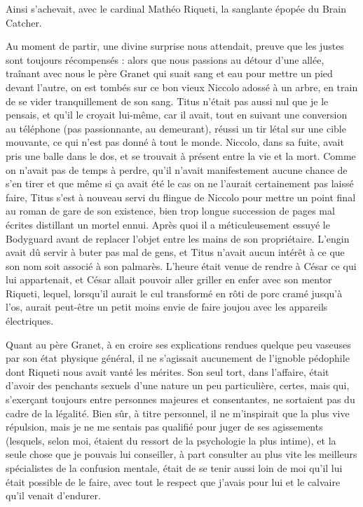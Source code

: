 Ainsi s’achevait, avec le cardinal Mathéo Riqueti, la sanglante épopée du Brain Catcher.

Au moment de partir, une divine surprise nous attendait, preuve que les justes sont toujours récompensés : alors que nous passions au détour d’une allée, traînant avec nous le père Granet qui suait sang et eau pour mettre un pied devant l’autre, on est tombés sur ce bon vieux Niccolo adossé à un arbre, en train de se vider tranquillement de son sang. Titus n’était pas aussi nul que je le pensais, et qu’il le croyait lui-même, car il avait, tout en suivant une conversion au téléphone (pas passionnante, au demeurant), réussi un tir létal sur une cible mouvante, ce qui n’est pas donné à tout le monde. Niccolo, dans sa fuite, avait pris une balle dans le dos, et se trouvait à présent entre la vie et la mort. Comme on n’avait pas de temps à perdre, qu’il n’avait manifestement aucune chance de s’en tirer et que même si ça avait été le cas on ne l’aurait certainement pas laissé faire, Titus s’est à nouveau servi du flingue de Niccolo pour mettre un point final au roman de gare de son existence, bien trop longue succession de pages mal écrites distillant un mortel ennui. Après quoi il a méticuleusement essuyé le Bodyguard avant de replacer l’objet entre les mains de son propriétaire. L’engin avait dû servir à buter pas mal de gens, et Titus n’avait aucun intérêt à ce que son nom soit associé à son palmarès. L’heure était venue de rendre à César ce qui lui appartenait, et César allait pouvoir aller griller en enfer avec son mentor Riqueti, lequel, lorsqu’il aurait le cul transformé en rôti de porc cramé jusqu’à l’os, aurait peut-être un petit moins envie de faire joujou avec les appareils électriques.

Quant au père Granet, à en croire ses explications rendues quelque peu vaseuses par son état physique général, il ne s’agissait aucunement de l’ignoble pédophile dont Riqueti nous avait vanté les mérites. Son seul tort, dans l’affaire, était d’avoir des penchants sexuels d’une nature un peu particulière, certes, mais qui, s’exerçant toujours entre personnes majeures et consentantes, ne sortaient pas du cadre de la légalité. Bien sûr, à titre personnel, il ne m’inspirait que la plus vive répulsion, mais je ne me sentais pas qualifié pour juger de ses agissements (lesquels, selon moi, étaient du ressort de la psychologie la plus intime), et la seule chose que je pouvais lui conseiller, à part consulter au plus vite les meilleurs spécialistes de la confusion mentale, était de se tenir aussi loin de moi qu’il lui était possible de le faire, avec tout le respect que j’avais pour lui et le calvaire qu’il venait d’endurer.

